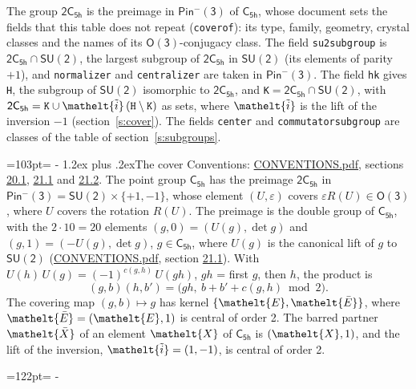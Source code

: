 \documentclass[10pt,a4paper]{article}
\makeatletter
\renewcommand\section{\@startsection{section}{1}{\z@}{-3ex plus -1ex minus -.2ex}%
  {1.2ex plus .2ex}{\normalfont\large\sffamily\bfseries\color{parttitle}}}
\newcommand{\needspace}[1]{\par\penalty-100\begingroup\dimen0=#1\relax\dimen2=\pagegoal
  \advance\dimen2-\pagetotal\ifdim\dimen0>\dimen2\relax\ifdim\dimen2>0pt\vfil\break\fi\fi
  \endgroup}
\numberwithin{equation}{section}
\newcommand{\eltfont}[1]{{\let\sigma\eltsigma\mathelt{#1}}}
\newcommand{\grp}[1]{\mathsf{#1}}
\newcommand{\elt}[1]{\eltfont{#1}}
\newcommand{\dirprod}{\times}
\newcommand{\barred}[1]{\bar{#1}}
\newcommand{\lift}[1]{\tilde{#1}}
\makeatother
\begin{document}
\leavevmode\label{n:element.inversion}\label{n:group.preimage}The group $\grp{2C_{5h}}$ is the preimage in $\grp{Pin^{-}(3)}$ of \href{../../../rotation/data/pdf/C5h.pdf}{$\grp{C_{5h}}$}, whose document sets the fields that this table does not repeat (\texttt{coverof}): its type, family, geometry, crystal classes and the names of its \href{../../../rotation/data/pdf/O3.pdf}{$\grp{O(3)}$}-conjugacy class. The field \texttt{su2subgroup} is $\grp{2C_{5h}} \cap \grp{SU(2)}$, the largest subgroup of $\grp{2C_{5h}}$ in $\grp{SU(2)}$ (its elements of parity $+1$), and \texttt{normalizer} and \texttt{centralizer} are taken in $\grp{Pin^{-}(3)}$. The field \texttt{hk} gives \texttt{H}, the subgroup of $\grp{SU(2)}$ isomorphic to $\grp{2C_{5h}}$, and \texttt{K}${} = \grp{2C_{5h}} \cap \grp{SU(2)}$, with $\grp{2C_{5h}} = \texttt{K} \cup \elt{\lift{i}}\,(\texttt{H} \setminus \texttt{K})$ as sets, where $\elt{\lift{i}}$ is the lift of the inversion $-1$ (section~\ref{s:cover}). The fields \texttt{center} and \texttt{commutatorsubgroup} are classes of the table of section~\ref{s:subgroups}.
\needspace{103pt}
\section{The cover}\label{s:cover}
Conventions: \href{../../CONVENTIONS.pdf}{CONVENTIONS.pdf}, sections \href{../../CONVENTIONS.pdf\#conv.20.1}{20.1}, \href{../../CONVENTIONS.pdf\#conv.21.1}{21.1} and \href{../../CONVENTIONS.pdf\#conv.21.2}{21.2}.
\leavevmode\label{n:group.pin.minus}\label{n:group.su2}\label{n:local.pin.sign}\label{n:matrix.covered}\label{n:matrix.lift.su2}\label{n:index.bar}The point group $\grp{C_{5h}}$ has the preimage $\grp{2C_{5h}}$ in $\grp{Pin^{-}(3)} = \grp{SU(2)} \dirprod \{+1, -1\}$, whose element $(U, \varepsilon)$ covers $\varepsilon R(U) \in \grp{O(3)}$, where $U$ covers the rotation $R(U)$. The preimage is the double group of $\grp{C_{5h}}$, with the $2 \cdot 10 = 20$ elements $(g, 0) = (U(g), \det g)$ and $(g, 1) = (-U(g), \det g)$, $g \in \grp{C_{5h}}$, where $U(g)$ is the canonical lift of $g$ to $\grp{SU(2)}$ (\href{../../CONVENTIONS.pdf}{CONVENTIONS.pdf}, section \href{../../CONVENTIONS.pdf\#conv.21.1}{21.1}). \label{n:function.cocycle}With $U(h)\,U(g) = (-1)^{c(g,h)}\,U(gh)$, $gh$ = first $g$, then $h$, the product is
\begin{equation}\label{e:product}(g, b)(h, b') = \bigl(gh,\ b + b' + c(g, h) \bmod 2\bigr).\end{equation}
\leavevmode\label{n:mark.bar}The covering map $(g, b) \mapsto g$ has kernel $\{\elt{E}, \elt{\barred{E}}\}$, where $\elt{\barred{E}} = (\elt{E}, 1)$ is central of order 2. \label{n:element.named}\label{n:mark.lift}The barred partner $\elt{\barred{X}}$ of an element $\elt{X}$ of $\grp{C_{5h}}$ is $(\elt{X}, 1)$, and the lift of the inversion, $\elt{\lift{i}} = (1, -1)$, is central of order 2.
\needspace{122pt}
\end{document}
